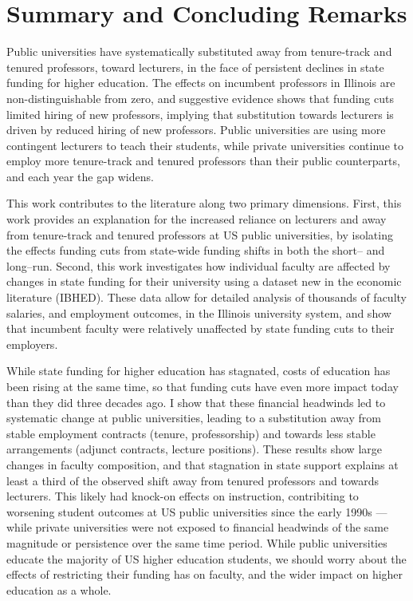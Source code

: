 \section{Summary and Concluding Remarks}
\label{sec:conclusion}
Public universities have systematically substituted away from tenure-track and tenured professors, toward lecturers, in the face of persistent declines in state funding for higher education.
The effects on incumbent professors in Illinois are non-distinguishable from zero, and suggestive evidence shows that funding cuts limited hiring of new professors, implying that substitution towards lecturers is driven by reduced hiring of new professors.
Public universities are using more contingent lecturers to teach their students, while private universities continue to employ more tenure-track and tenured professors than their public counterparts, and each year the gap widens.

This work contributes to the literature along two primary dimensions.
First, this work provides an explanation for the increased reliance on lecturers and away from tenure-track and tenured professors at US public universities, by isolating the effects funding cuts from state-wide funding shifts in both the short-- and long--run.
Second, this work investigates how individual faculty are affected by changes in state funding for their university using a dataset new in the economic literature (IBHED).
These data allow for detailed analysis of thousands of faculty salaries, and employment outcomes, in the Illinois university system, and show that incumbent faculty were relatively unaffected by state funding cuts to their employers.

While state funding for higher education has stagnated, costs of education has been rising at the same time, so that funding cuts have even more impact today than they did three decades ago.
I show that these financial headwinds led to systematic change at public universities, leading to a substitution away from stable employment contracts (tenure, professorship) and towards less stable arrangements (adjunct contracts, lecture positions).
These results show large changes in faculty composition, and that stagnation in state support explains at least a third of the observed shift away from tenured professors and towards lecturers.
This likely had knock-on effects on instruction, contribiting to worsening student outcomes at US public universities since the early 1990s --- while private universities were not exposed to financial headwinds of the same magnitude or persistence over the same time period.
While public universities educate the majority of US higher education students, we should worry about the effects of restricting their funding has on faculty, and the wider impact on higher education as a whole.
